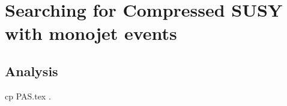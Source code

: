 \chapter{Searching for Compressed SUSY with monojet events}
\label{chap:sus13009}

\chapterquote{}

\section{Analysis}
cp PAS.tex .
